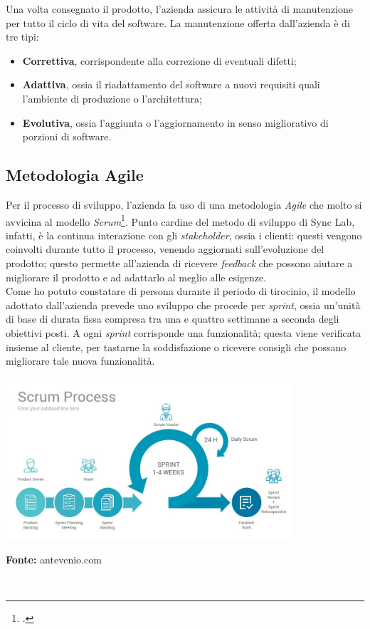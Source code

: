 Una volta consegnato il prodotto, l'azienda assicura le attività di manutenzione per tutto il ciclo di vita del software. La manutenzione offerta dall'azienda è di tre tipi:
\begin{itemize}
  \item \textbf{Correttiva}, corrispondente alla correzione di eventuali difetti;
  \item \textbf{Adattiva}, ossia il riadattamento del software a nuovi requisiti quali l'ambiente di produzione o l'architettura;
  \item \textbf{Evolutiva}, ossia l'aggiunta o l'aggiornamento in senso migliorativo di porzioni di software.
\end{itemize}

\subsection{Metodologia Agile}

Per il processo di sviluppo, l'azienda fa uso di una metodologia \textit{Agile} che molto si avvicina al modello \textit{Scrum}\footcite{tec:scrum}. Punto cardine del metodo di sviluppo di Sync Lab, infatti, è la continua interazione con gli \textit{stakeholder}, ossia i clienti: questi vengono coinvolti durante tutto il processo, venendo aggiornati sull'evoluzione del prodotto; questo permette all'azienda di ricevere \textit{feedback} che possono aiutare a migliorare il prodotto e ad adattarlo al meglio alle esigenze. \\
Come ho potuto constatare di persona durante il periodo di tirocinio, il modello adottato dall'azienda prevede uno sviluppo che procede per \textit{sprint}, ossia un'unità di base di durata fissa compresa tra una e quattro settimane a seconda degli obiettivi posti. A ogni \textit{sprint} corrisponde una funzionalità; questa viene verificata insieme al cliente, per tastarne la soddisfazione o ricevere consigli che possano migliorare tale nuova funzionalità. \\

\begin{minipage}{\linewidth}
  \label{img:scrum}
  \centering
    \includegraphics[height=6cm]{immagini/scrumprocess}
  \caption*{\textbf{Fonte:} antevenio.com}
\end{minipage} \\

